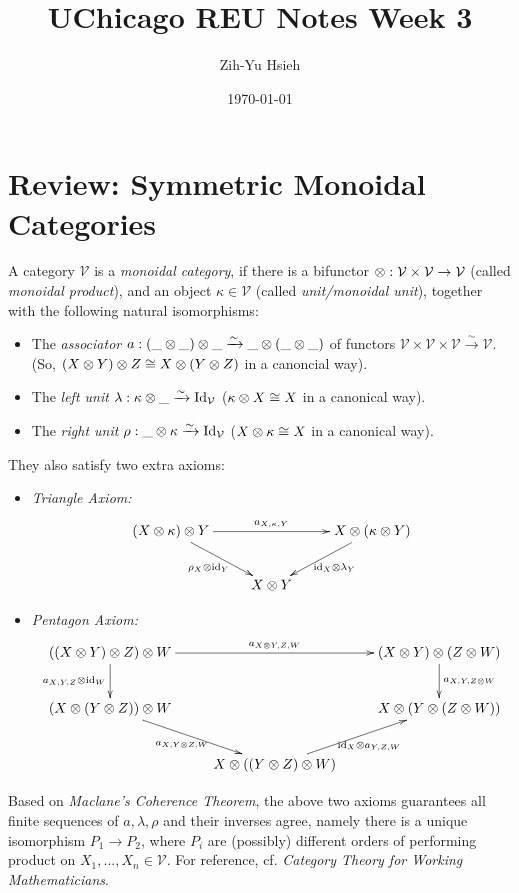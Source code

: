 \documentclass{article}
\title{UChicago REU Notes Week 3}
\author{Zih-Yu Hsieh}
\date{\today}
\begin{document}
\maketitle
\tableofcontents

\section{Review: Symmetric Monoidal Categories}

\begin{defn}
    A category $\mathcal{V}$ is a \emph{monoidal category}, if there is a bifunctor $\otimes:\mathcal{V}\times\mathcal{V}\rightarrow\mathcal{V}$ (called \emph{monoidal product}), and an object $\kappa\in\mathcal{V}$ (called \emph{unit/monoidal unit}), together with the following natural isomorphisms:
    \begin{itemize}
        \item The \emph{associator} $a:(\_\otimes \_)\otimes \_ \xrightarrow{\sim} \_\otimes(\_\otimes \_)$ of functors $\mathcal{V}\times\mathcal{V}\times\mathcal{V}\xrightarrow{\sim}\mathcal{V}$. (So, $(X\otimes Y)\otimes Z\cong X\otimes(Y\otimes Z)$ in a canoncial way).
        \item The \emph{left unit} $\lambda:\kappa\otimes\_\xrightarrow{\sim} \mathrm{Id}_{\mathcal{V}}$ ($\kappa\otimes X\cong X$ in a canonical way).
        \item The \emph{right unit} $\rho:\_\otimes \kappa\xrightarrow{\sim}\mathrm{Id}_\mathcal{V}$ ($X\otimes \kappa\cong X$ in a canonical way).
    \end{itemize} 

    They also satisfy two extra axioms:
    \begin{itemize}
        \item \emph{Triangle Axiom:}
        \[\xymatrix{
            (X\tensor \kappa)\tensor Y \ar[dr]_-{\rho_X \tensor \id_Y} \ar[rr]^-{a_{X,\kappa,Y}} && X\tensor (\kappa\tensor Y) \ar[dl]^-{\id_X\tensor \lambda_Y}\\
            & X\tensor Y
        }\]
        \item \emph{Pentagon Axiom:}
        \[\xymatrix{
            ((X\tensor Y)\tensor Z)\tensor W \ar[rr]^-{a_{X\tensor Y,Z,W}} \ar[d]_-{a_{X,Y,Z}\tensor \id_W} && (X\tensor Y)\tensor(Z\tensor W) \ar[d]^-{a_{X,Y,Z\tensor W}}\\
            (X\tensor (Y\tensor Z))\tensor W \ar[dr]_-{a_{X,Y\tensor Z,W}} && X\tensor (Y\tensor (Z\tensor W)) \\
            & X\tensor ((Y\tensor Z)\tensor W) \ar[ur]_-{\id_X\tensor a_{Y,Z,W}}
        }\]
    \end{itemize}
\end{defn}
Based on \emph{Maclane's Coherence Theorem}, the above two axioms guarantees all finite sequences of $a,\lambda,\rho$ and their inverses agree, namely there is a unique isomorphism $P_1\rightarrow P_2$, where $P_i$ are (possibly) different orders of performing product on $X_1,...,X_n\in\mathcal{V}$. For reference, cf. \emph{Category Theory for Working Mathematicians}.
\end{document}
